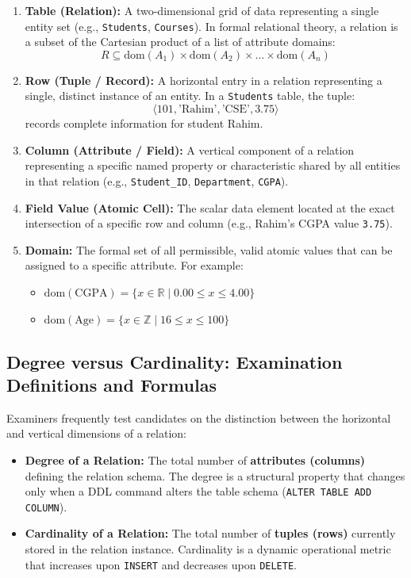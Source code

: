 \begin{enumerate}
\item \textbf{Table (Relation):} A two-dimensional grid of data representing a single entity set (e.g., \texttt{Students}, \texttt{Courses}). In formal relational theory, a relation is a subset of the Cartesian product of a list of attribute domains:
\[ R \subseteq \text{dom}(A_1) \times \text{dom}(A_2) \times \dots \times \text{dom}(A_n) \]
\item \textbf{Row (Tuple / Record):} A horizontal entry in a relation representing a single, distinct instance of an entity. In a \texttt{Students} table, the tuple:
\[ \langle 101, \text{'Rahim'}, \text{'CSE'}, 3.75 \rangle \]
records complete information for student Rahim.
\item \textbf{Column (Attribute / Field):} A vertical component of a relation representing a specific named property or characteristic shared by all entities in that relation (e.g., \texttt{Student\_ID}, \texttt{Department}, \texttt{CGPA}).
\item \textbf{Field Value (Atomic Cell):} The scalar data element located at the exact intersection of a specific row and column (e.g., Rahim's CGPA value \texttt{3.75}).
\item \textbf{Domain:} The formal set of all permissible, valid atomic values that can be assigned to a specific attribute. For example:
\begin{itemize}
\item $\text{dom}(\text{CGPA}) = \{ x \in \mathbb{R} \mid 0.00 \le x \le 4.00 \}$
\item $\text{dom}(\text{Age}) = \{ x \in \mathbb{Z} \mid 16 \le x \le 100 \}$
\end{itemize}
\end{enumerate}

\subsection{Degree versus Cardinality: Examination Definitions and Formulas}

Examiners frequently test candidates on the distinction between the horizontal and vertical dimensions of a relation:

\begin{itemize}
\item \textbf{Degree of a Relation:} The total number of \textbf{attributes (columns)} defining the relation schema. The degree is a structural property that changes only when a DDL command alters the table schema (\texttt{ALTER TABLE ADD COLUMN}).
\item \textbf{Cardinality of a Relation:} The total number of \textbf{tuples (rows)} currently stored in the relation instance. Cardinality is a dynamic operational metric that increases upon \texttt{INSERT} and decreases upon \texttt{DELETE}.
\end{itemize}

